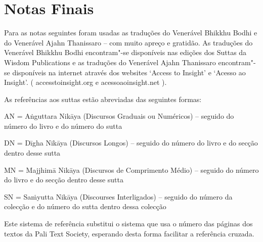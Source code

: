 \chapter{Notas Finais}

Para as notas seguintes foram usadas as traduções do Venerável Bhikkhu Bodhi e do Venerável Ajahn Thanissaro -- com muito apreço e gratidão. As traduções do Venerável Bhikkhu Bodhi encontram"-se disponíveis nas edições dos Suttas da Wisdom Publications e as traduções do Venerável Ajahn Thanissaro encontram"-se disponíveis na internet através dos websites `Access to Insight' e `Acesso ao Insight'. ( accesstoinsight.org e acessoaoinsight.net ).

As referências aos suttas estão abreviadas das seguintes formas:

AN = Aṅguttara Nikāya (Discursos Graduais ou Numéricos) -- seguido do número do livro e do número do sutta

DN = Dīgha Nikāya (Discursos Longos) -- seguido do número do livro e do secção dentro desse sutta

MN = Majjhimā Nikāya (Discursos de Comprimento Médio) -- seguido do número do livro e do secção dentro desse sutta

SN = Saṁyutta Nikāya (Discourses Interligados) -- seguido do número da colecção e do número do sutta dentro dessa colecção

Este sistema de referência substitui o sistema que usa o número das páginas dos textos da Pali Text Society, esperando desta forma facilitar a referência cruzada.

\printpagenotes*
